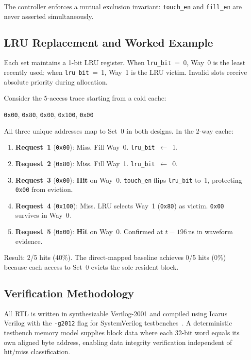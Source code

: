 \documentclass[conference]{IEEEtran}
\begin{document}
The controller enforces a mutual exclusion invariant: \texttt{touch\_en} and \texttt{fill\_en} are never asserted simultaneously.

\subsection{LRU Replacement and Worked Example}

Each set maintains a 1-bit LRU register.  When \texttt{lru\_bit}~=~0, Way~0 is the least recently used; when \texttt{lru\_bit}~=~1, Way~1 is the LRU victim.  Invalid slots receive absolute priority during allocation.

Consider the 5-access trace starting from a cold cache:
\begin{center}
\texttt{0x00}, \texttt{0x80}, \texttt{0x00}, \texttt{0x100}, \texttt{0x00}
\end{center}

All three unique addresses map to Set~0 in both designs.  In the 2-way cache:

\begin{enumerate}
  \item \textbf{Request~1} (\texttt{0x00}): Miss.  Fill Way~0.  \texttt{lru\_bit}~$\leftarrow$~1.
  \item \textbf{Request~2} (\texttt{0x80}): Miss.  Fill Way~1.  \texttt{lru\_bit}~$\leftarrow$~0.
  \item \textbf{Request~3} (\texttt{0x00}): \textbf{Hit} on Way~0.  \texttt{touch\_en} flips \texttt{lru\_bit} to~1, protecting \texttt{0x00} from eviction.
  \item \textbf{Request~4} (\texttt{0x100}): Miss.  LRU selects Way~1 (\texttt{0x80}) as victim.  \texttt{0x00} survives in Way~0.
  \item \textbf{Request~5} (\texttt{0x00}): \textbf{Hit} on Way~0.  Confirmed at $t=196$\,ns in waveform evidence.
\end{enumerate}

Result: 2/5 hits (40\%).  The direct-mapped baseline achieves 0/5 hits (0\%) because each access to Set~0 evicts the sole resident block.

\subsection{Verification Methodology}

All RTL is written in synthesizable Verilog-2001 and compiled using Icarus Verilog with the \texttt{-g2012} flag for SystemVerilog testbenches~\cite{icarus-verilog}.  A deterministic testbench memory model supplies block data where each 32-bit word equals its own aligned byte address, enabling data integrity verification independent of hit/miss classification.
\end{document}
